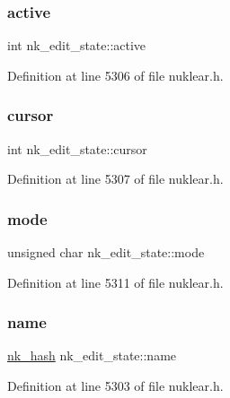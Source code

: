 \subsubsection{\texorpdfstring{active}{active}}
{\footnotesize\ttfamily int nk\+\_\+edit\+\_\+state\+::active}



Definition at line 5306 of file nuklear.\+h.

\mbox{\label{structnk__edit__state_ab416471cb61eacf633a05ad54d8c6bc8}} 
\subsubsection{\texorpdfstring{cursor}{cursor}}
{\footnotesize\ttfamily int nk\+\_\+edit\+\_\+state\+::cursor}



Definition at line 5307 of file nuklear.\+h.

\mbox{\label{structnk__edit__state_ae841853374d727742a6ac7d31e9346e6}} 
\subsubsection{\texorpdfstring{mode}{mode}}
{\footnotesize\ttfamily unsigned char nk\+\_\+edit\+\_\+state\+::mode}



Definition at line 5311 of file nuklear.\+h.

\mbox{\label{structnk__edit__state_a87920c698f22575eab9d07d5ebae318e}} 
\subsubsection{\texorpdfstring{name}{name}}
{\footnotesize\ttfamily \mbox{\hyperlink{nuklear_8h_a2123e2728db7d1f136b57d6528a0d757}{nk\+\_\+hash}} nk\+\_\+edit\+\_\+state\+::name}



Definition at line 5303 of file nuklear.\+h.

